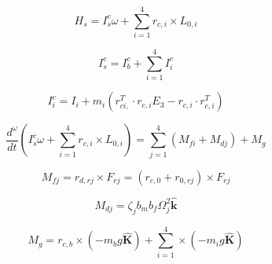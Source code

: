 \documentclass[11pt,a4paper]{article}
\begin{document}
\begin{equation}
H_{s} = I_{s}^{c}\omega + \sum_{i=1}^{4}r_{c,i} \times L_{0,i}
\label{eq:Hs2}
\end{equation}

\begin{equation}
I_{s}^{c} = I_{b}^{c} + \sum_{i=1}^{4}I_{i}^{c}
\label{eq:Ics}
\end{equation}

\begin{equation}
I_{i}^{c} = I_{i} + m_{i} \left(  r_{ci,}^{T} \cdot r_{c,i}E_{3} - r_{c,i}\cdot r_{c,i}^{T} \right)
\label{eq:Iic}
\end{equation}

\begin{equation}
\frac{d^{\omega}}{dt} \left( I_{s}^{c} \omega + \sum_{i=1}^{4} r_{c,i}\times L_{0,i}  \right) = \sum_{j=1}^{4}(M_{fi} + M_{dj}) + M_{g}
\label{eq:dtM}
\end{equation}

\begin{equation}
M_{fj} = r_{d,rj} \times F_{rj} = (r_{c,0} + r_{0,rj}) \times F_{rj}
\label{eq:Mfj}
\end{equation}

\begin{equation}
M_{dj} = \zeta_{j}b_{m}b_{f}\Omega_{j}^{2} \bm{\hat{k}}
\label{eq:Mdj}
\end{equation}


\begin{equation}
M_{g} = r_{c,b} \times (-m_{b}g \bm{\hat{K}}) + \sum_{i=1}^{4} \times (-m_{i}g \bm{\hat{K}})
\label{eq:Mg}
\end{equation}
\end{document}
